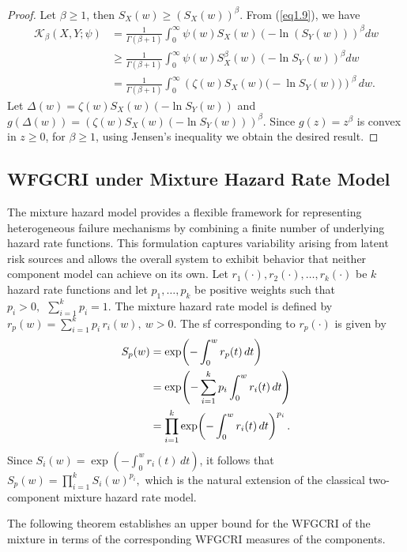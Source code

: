 \documentclass[12pt,a4paper]{article}
\numberwithin{equation}{section}
\begin{document}
	\begin{proof}
		Let $\beta\geq 1$, then  $S_X(w)\geq \left(S_X(w)\right)^\beta$.  From (\ref{eq1.9}), we have 
		\begin{align*}
		\mathcal K_\beta(X,Y;\psi)&=\frac{1}{\Gamma(\beta+1)}\int_0^{\infty}\psi(w) S_X(w)\left(-\ln (S_Y(w))\right)^\beta dw\\
			&\geq \frac{1}{\Gamma(\beta+1)}\int_0^{\infty} \psi(w)S_X^\beta (w)\left(-\ln S_Y(w)\right)^\beta dw\\
			&=\frac{1}{\Gamma(\beta+1)} \int_0^{\infty}\left(\zeta(w)S_X(w)\big(-\ln S_Y(w)\big)\right)^\beta \,dw.
		\end{align*}
		Let $\Delta(w)=\zeta(w)S_X(w)\left(-\ln S_Y(w)\right)$ and $g(\Delta(w))=\left(\zeta(w)S_X(w)\left(-\ln S_Y(w)\right)\right)^\beta$. Since $g(z)=z^\beta$ is convex in $z\geq 0$, for $\beta\geq 1$, using Jensen's inequality
		we obtain the desired result. 
	\end{proof}
 \subsection{WFGCRI under Mixture Hazard Rate Model}
The mixture hazard model provides a flexible framework for representing heterogeneous failure mechanisms by combining a finite number of underlying hazard rate functions. This formulation
captures variability arising from latent risk sources and allows the overall system to
exhibit behavior that neither component model can achieve on its own.
Let $r_1(\cdot), r_2(\cdot), \dots, r_k(\cdot)$ be $k$ hazard rate functions and let
$p_1,\dots,p_k$ be positive weights such that $p_i>0,~~ \sum_{i=1}^k p_i = 1.$
The {mixture hazard rate model} is defined by
$	r_p(w)=\sum_{i=1}^k p_i\, r_i(w), ~ w>0.$ The sf corresponding to $r_p(\cdot)$ is given by
\begin{align}\label{eq:2.3}
	S_p(w)
	&=\exp\!\left(-\int_0^{w} r_p(t)\,dt\right) \notag\\
	&=\exp\!\left(-\sum_{i=1}^k p_i \int_0^{w} r_i(t)\,dt\right) \notag\\
	&=\prod_{i=1}^k
	\exp\!\left(-\int_0^{w} r_i(t)\,dt\right)^{p_i}.
\end{align}
Since $S_i(w)=\exp\!\left(-\int_0^{w} r_i(t)\,dt\right)$, it follows that
$S_p(w)=\prod_{i=1}^k S_i(w)^{p_i},$
which is the natural extension of the classical two-component mixture hazard rate model.

\medskip

The following theorem establishes an upper bound for the WFGCRI of the mixture
in terms of the corresponding WFGCRI measures of the components.
\end{document}
